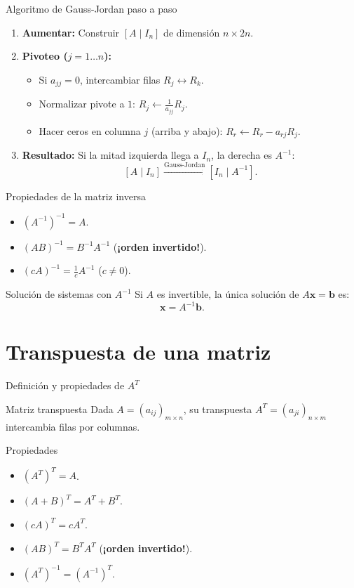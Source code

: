 \documentclass[11pt]{beamer}
\newcommand{\vv}[1]{\mathbf{#1}}
\begin{document}
\begin{frame}{Algoritmo de Gauss-Jordan paso a paso}
  \begin{enumerate}
    \item \textbf{Aumentar:} Construir $[A \mid I_n]$ de dimensión $n\times 2n$.
    \item \textbf{Pivoteo ($j=1\dots n$):}
      \begin{itemize}
        \item Si $a_{jj}=0$, intercambiar filas $R_j \leftrightarrow R_k$.
        \item Normalizar pivote a $1$: $R_j \leftarrow \frac{1}{a_{jj}} R_j$.
        \item Hacer ceros en columna $j$ (arriba y abajo): $R_r \leftarrow R_r - a_{rj} R_j$.
      \end{itemize}
    \item \textbf{Resultado:} Si la mitad izquierda llega a $I_n$, la derecha es $A^{-1}$:
      \[
        [A \mid I_n] \xrightarrow{\text{Gauss-Jordan}} [I_n \mid A^{-1}].
      \]
  \end{enumerate}
\end{frame}

\begin{frame}{Propiedades de la matriz inversa}
  \begin{itemize}
    \item $(A^{-1})^{-1} = A$.
    \item $(AB)^{-1} = B^{-1} A^{-1}$ \quad (\textbf{¡orden invertido!}).
    \item $(cA)^{-1} = \frac{1}{c} A^{-1}$ \quad ($c \neq 0$).
  \end{itemize}
  \vfill
  \begin{block}{Solución de sistemas con $A^{-1}$}
    Si $A$ es invertible, la única solución de $A\vv{x} = \vv{b}$ es:
    \[
      \vv{x} = A^{-1}\vv{b}.
    \]
  \end{block}
\end{frame}

\section{Transpuesta de una matriz}

\begin{frame}{Definición y propiedades de $A^T$}
  \begin{block}{Matriz transpuesta}
    Dada $A=(a_{ij})_{m\times n}$, su transpuesta $A^T=(a_{ji})_{n\times m}$ intercambia filas por columnas.
  \end{block}
  \vfill
  \begin{block}{Propiedades}
    \begin{itemize}
      \item $(A^T)^T = A$.
      \item $(A+B)^T = A^T + B^T$.
      \item $(cA)^T = c A^T$.
      \item $(AB)^T = B^T A^T$ \quad (\textbf{¡orden invertido!}).
      \item $(A^T)^{-1} = (A^{-1})^T$.
    \end{itemize}
  \end{block}
\end{frame}
\end{document}
